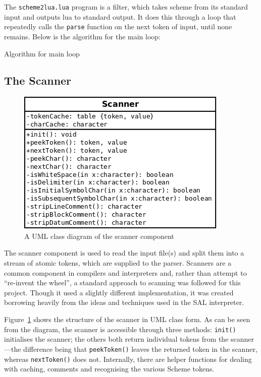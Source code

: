 The \texttt{scheme2lua.lua} program is a filter, which takes scheme from its
standard input and outputs lua to standard output. It does this through a loop
that repeatedly calls the \texttt{parse} function on the next token of input,
until none remains. Below is the algorithm for the main loop:

\begin{framed}
Algorithm for main loop
\end{framed}

\subsection{The Scanner}

\begin{figure}
\centering
\includegraphics[width=\textwidth]{scannerUML.png}
\caption{A UML class diagram of the scanner component}
\label{fig:scannerUML}
\end{figure}

The scanner component is used to read the input file(s) and split them into a
stream of atomic tokens, which are supplied to the parser. Scanners are a common
component in compilers and interpreters and, rather than attempt to ``re-invent
the wheel'', a standard approach to scanning was followed for this project.
Though it used a slightly different implementation, it was created borrowing
heavily from the ideas and techniques used in the SAL interpreter\cite{sal}.

Figure~\ref{fig:scannerUML} shows the structure of the scanner in UML class
form. As can be seen from the diagram, the scanner is accessible through three
methods: \texttt{init()} initialises the scanner; the others both return
individual tokens from the scanner---the difference being that
\texttt{peekToken()} leaves the returned token in the scanner, whereas
\texttt{nextToken()} does not. Internally, there are helper functions for
dealing with caching, comments and recognising the various Scheme tokens.

